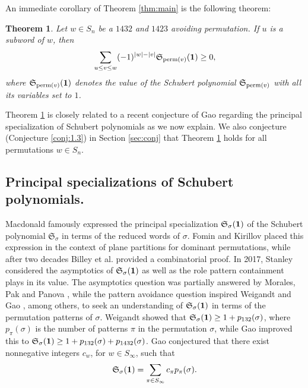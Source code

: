 \documentclass{amsart}
\newtheorem{theorem}{Theorem}[section]
\theoremstyle{definition}
\theoremstyle{named}
\newcommand*{\Schub}{\mathfrak{S}}
\begin{document}
	An immediate corollary of  Theorem \ref{thm:main}  is the following theorem: 
	\begin{theorem} \label{cor:main}
		Let $w \in S_n$ be a $1432$ and $1423$ avoiding permutation. If $u$ is a subword of $w$, then
		\begin{equation} \label{eqn:cw}
			\sum_{u \le v \le w} (-1)^{\left|w\right|-\left|v\right|} \Schub_{\textup{perm}(v)}({\bf1})\geq 0,
		\end{equation}
		where $\Schub_{\textup{perm}(v)}({\bf1})$ denotes the value of the Schubert polynomial $\Schub_{\textup{perm}(v)}$ with all its variables set to $1$.
	\end{theorem}

		Theorem \ref{cor:main} is closely related to a recent conjecture of Gao \cite[Conjecture 3.2]{Gao} regarding the principal specialization of Schubert polynomials as we now explain. We also conjecture (Conjecture \ref{conj:1.3}) in Section \ref{sec:conj} that Theorem \ref{cor:main} holds for all permutations $w \in S_n$. 

		\subsection{Principal specializations of Schubert polynomials.} Macdonald \cite[Eq. 6.11]{macdonald} famously expressed the principal specialization $\Schub_{\sigma}(\bf{1})$ of the Schubert polynomial $\Schub_{\sigma}$  in terms of the reduced words of $\sigma$. Fomin and Kirillov \cite{reduced} placed this expression in the context of plane partitions for dominant permutations, while after two decades Billey et al. \cite{bijmac} provided a combinatorial proof. In 2017, Stanley \cite{she} considered the asymptotics of   $\Schub_{\sigma}(\bf{1})$  as well as the role pattern containment plays in its value. The asymptotics question was partially answered by Morales, Pak and Panova \cite{pak}, while the pattern avoidance question  inspired Weigandt \cite{132} and Gao \cite{Gao}, among others, to seek an understanding of $\Schub_{\sigma}(\bf{1})$ in terms of the permutation patterns of $\sigma$. Weigandt showed that $\Schub_{\sigma}({\bf 1})\geq 1+p_{132}(\sigma)$, where  $p_{\pi}(\sigma)$ is the number of patterns $\pi$ in the permutation $\sigma$, while Gao improved this to $\Schub_{\sigma}({\bf 1})\geq 1+p_{132}(\sigma)+p_{1432}(\sigma)$. Gao conjectured that there exist nonnegative integers $c_w$, for $w \in S_{\infty}$, such that    $$\Schub_{\sigma}({\bf 1})=\sum_{\pi \in S_{\infty}} c_{\pi}p_{\pi}(\sigma).$$ 
\end{document}
